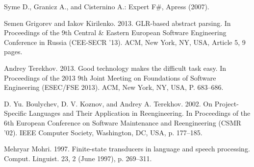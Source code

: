 \documentclass{acm_proc_article-sp}
\begin{document}
\begin{thebibliography}{}
Syme D., Granicz A., and Cisternino A.: Expert F\#, Apress (2007).



Semen Grigorev and Iakov Kirilenko. 2013. GLR-based abstract parsing. In Proceedings of the 9th Central \& Eastern European Software Engineering Conference in Russia (CEE-SECR '13). ACM, New York, NY, USA, Article 5, 9 pages.

Andrey Terekhov. 2013. Good technology makes the difficult task easy. In Proceedings of the 2013 9th Joint Meeting on Foundations of Software Engineering (ESEC/FSE 2013). ACM, New York, NY, USA, P. 683--686.

D. Yu. Boulychev, D. V. Koznov, and Andrey A. Terekhov. 2002. On Project-Specific Languages and Their Application in Reengineering. In Proceedings of the 6th European Conference on Software Maintenance and Reengineering (CSMR '02). IEEE Computer Society, Washington, DC, USA, p. 177--185.

Mehryar Mohri. 1997. Finite-state transducers in language and speech processing. Comput. Linguist. 23, 2 (June 1997), p. 269--311.


\end{thebibliography}

\balancecolumns


\end{document}
